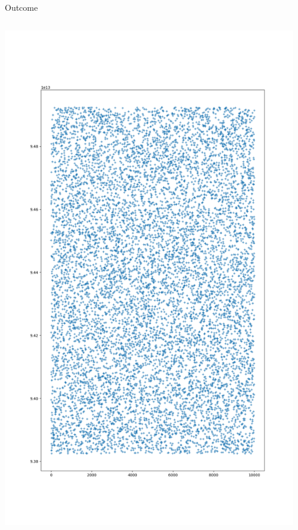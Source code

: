 \documentclass{beamer}
\begin{document}
\begin{frame}{Outcome}
    \begin{columns}
        \begin{column}{0.5\textwidth}
            \centering\includegraphics[height=.95\textheight]{Figure_1.png}
        \end{column}
        \begin{column}{.5\textwidth}

\end{column}
\end{columns}
\end{frame}
\end{document}
